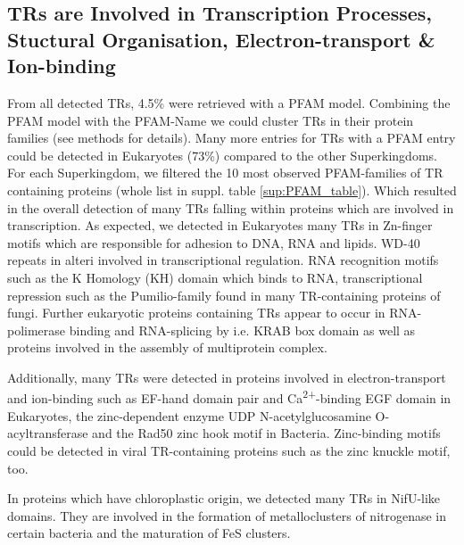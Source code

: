 \documentclass[a4,center,fleqn]{NAR}
\begin{document}
\subsection{TRs are Involved in Transcription Processes, Stuctural Organisation, Electron-transport \& Ion-binding}
From all detected TRs, 4.5\% were retrieved with a PFAM model. Combining the PFAM model with the PFAM-Name we could cluster TRs in their protein families (see methods for details). Many more entries for TRs with a PFAM entry could be detected in Eukaryotes (73\%) compared to the other Superkingdoms.\\
For each Superkingdom, we filtered the 10 most observed PFAM-families of TR containing proteins (whole list in suppl. table \ref{sup:PFAM_table}).
Which resulted in the overall detection of many TRs falling within proteins which are involved in transcription. As expected, we detected in Eukaryotes many TRs in Zn-finger motifs which are responsible for adhesion to DNA, RNA and lipids. WD-40 repeats in alteri involved in transcriptional regulation. RNA recognition motifs such as the K Homology (KH) domain which binds to RNA, transcriptional repression such as the Pumilio-family found in many TR-containing proteins of fungi. Further eukaryotic proteins containing TRs appear to occur in  RNA-polimerase binding and RNA-splicing by i.e. KRAB box domain as well as proteins involved in the assembly of multiprotein complex.

Additionally, many TRs were detected in proteins involved in electron-transport and ion-binding such as EF-hand domain pair and Ca\textsuperscript{2+}-binding EGF domain in Eukaryotes, the zinc-dependent enzyme UDP N-acetylglucosamine O-acyltransferase and the Rad50 zinc hook motif in Bacteria. Zinc-binding motifs could be detected in viral TR-containing proteins such as the zinc knuckle motif, too.

In proteins which have chloroplastic origin, we detected many TRs in NifU-like domains.
They are involved in the formation of metalloclusters of nitrogenase in certain bacteria and the maturation of FeS clusters. 
\end{document}
